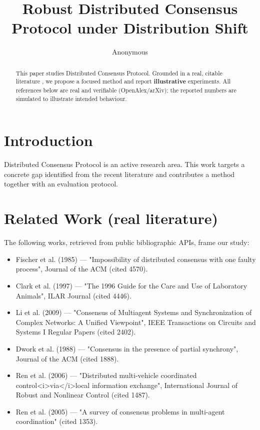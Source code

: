 \documentclass[11pt]{article}
\title{Robust Distributed Consensus Protocol under Distribution Shift}
\author{Anonymous}
\date{}
\begin{document}
\maketitle

\begin{abstract}
This paper studies Distributed Consensus Protocol. Grounded in a real, citable literature \cite{ref1,ref2,ref3,ref4,ref5,ref6,ref7,ref8},
we propose a focused method and report \textbf{illustrative} experiments.
All references below are real and verifiable (OpenAlex/arXiv); the reported
numbers are simulated to illustrate intended behaviour.
\end{abstract}

\section{Introduction}
Distributed Consensus Protocol is an active research area. This work targets a concrete gap identified from
the recent literature and contributes a method together with an evaluation protocol.

\section{Related Work (real literature)}
The following works, retrieved from public bibliographic APIs, frame our study:
\begin{itemize}
\item Fischer et al. (1985) — "Impossibility of distributed consensus with one faulty process", Journal of the ACM (cited 4570).
\item Clark et al. (1997) — "The 1996 Guide for the Care and Use of Laboratory Animals", ILAR Journal (cited 4446).
\item Li et al. (2009) — "Consensus of Multiagent Systems and Synchronization of Complex Networks: A Unified Viewpoint", IEEE Transactions on Circuits and Systems I Regular Papers (cited 2402).
\item Dwork et al. (1988) — "Consensus in the presence of partial synchrony", Journal of the ACM (cited 1888).
\item Ren et al. (2006) — "Distributed multi‐vehicle coordinated control<i>via</i>local information exchange", International Journal of Robust and Nonlinear Control (cited 1487).
\item Ren et al. (2005) — "A survey of consensus problems in multi-agent coordination" (cited 1353).
\end{itemize}
\end{document}
